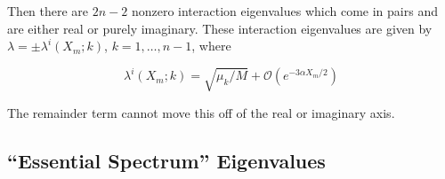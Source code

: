 \documentclass[12pt]{article}
\begin{document}
Then there are $2n-2$ nonzero interaction eigenvalues which come in pairs and are either real or purely imaginary. These interaction eigenvalues are given by $\lambda = \pm \lambda^i(X_m; k)$, $k = 1, \dots, n-1$, where

\begin{equation}\label{inteigs}
\lambda^i(X_m; k) = \sqrt{\mu_k / M} + \mathcal{O}(e^{-3 \alpha X_m/2})
\end{equation}

The remainder term cannot move this off of the real or imaginary axis.

\subsection{``Essential Spectrum'' Eigenvalues}
\end{document}
